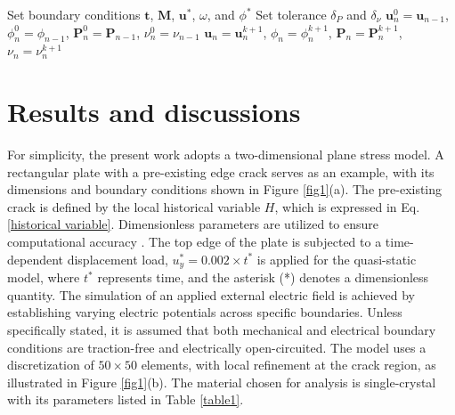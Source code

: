 \documentclass[final,times,fleqn,11pt]{elsarticle}
\begin{document}
\begin{algorithm}[!htbp]
    \BlankLine
    Set boundary conditions $\mathbf{t}$, $\mathbf{M}$, $\mathbf{u}^*$, $\omega$, and $\phi^*$ \;
    Set tolerance $\delta_P$ and $\delta_\nu$ \;
    $\mathbf{u}_{n}^0=\mathbf{u}_{n-1}$, $\phi_{n}^0=\phi_{n-1}$, $\mathbf{P}_{n}^0=\mathbf{P}_{n-1}$, $\nu_{n}^0=\nu_{n-1}$\;
    $\mathbf{u}_{n}=\mathbf{u}_{n}^{k+1}$, $\phi_{n}=\phi_{n}^{k+1}$, $\mathbf{P}_{n}=\mathbf{P}_{n}^{k+1}$, $\nu_{n}=\nu_{n}^{k+1}$

    \caption{Flowchart of the staggered scheme}\label{flowchart}
\end{algorithm}

\section{Results and discussions}\label{Section4}
For simplicity, the present work adopts a two-dimensional plane stress model. A rectangular plate with a pre-existing edge crack serves as an example, with its dimensions and boundary conditions shown in Figure \ref{fig1}(a). The pre-existing crack is defined by the local historical variable $H$, which is expressed in Eq.\eqref{historical variable}. Dimensionless parameters are utilized to ensure computational accuracy \cite{chang_liu_isogeometric_2019}. The top edge of the plate is subjected to a time-dependent displacement load, $u_y^*=0. 002\times t^*$ is applied for the quasi-static model, where $t^*$ represents time, and the asterisk (*) denotes a dimensionless quantity. The simulation of an applied external electric field is achieved by establishing varying electric potentials across specific boundaries.  Unless specifically stated, it is assumed that both mechanical and electrical boundary conditions are traction-free and electrically open-circuited. The model uses a discretization of $50 \times 50$ elements, with local refinement at the crack region, as illustrated in Figure \ref{fig1}(b).  The material chosen for analysis is single-crystal  with its parameters listed in Table \ref{table1}. 
 
\end{document}
